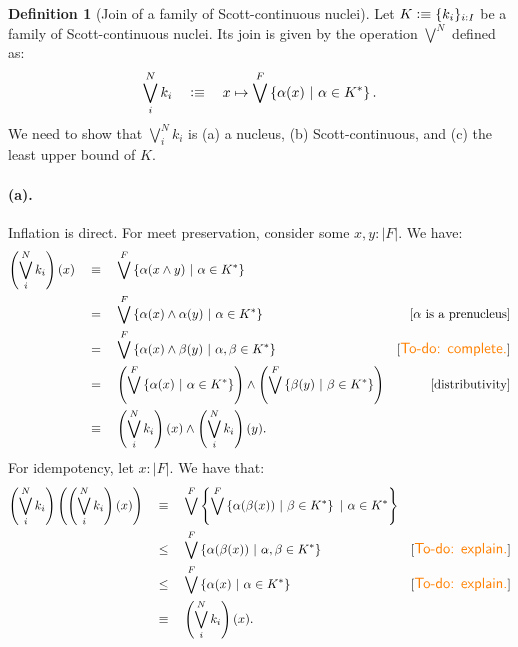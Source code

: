 \documentclass[a4paper, 11pt]{article}
\theoremstyle{definition}
\newtheorem{defn}{Definition}
\newcommand{\paren}[1]{\left( #1 \right)}
\newcommand{\setof}[1]{\left\{ #1 \right\}}
\newcommand{\is}{\vcentcolon\equiv}
\newcommand{\todo}[1]{{\large\color{orange}\textsf{To-do: #1.}}}
\begin{document}
\begin{defn}[Join of a family of Scott-continuous nuclei]
  Let $K \is \{ k_i \}_{i : I}$ be a family of Scott-continuous nuclei. Its join is given by
  the operation $\bigvee^N$ defined as:
  \begin{equation*}
    \bigvee^N_{i} k_i \quad\is\quad x \mapsto \bigvee^F \left\{ \alpha(x) ~|~ \alpha \in K^* \right\}.
  \end{equation*}
  We need to show that $\bigvee^N_{i} k_i$ is
    (a) a nucleus,
    (b) Scott-continuous, and
    (c) the least upper bound of $K$.

  \paragraph{(a).} Inflation is direct. For meet preservation, consider some $x, y : | F |$. We have:
  \begin{align*}
    \left(\bigvee^N_{i} k_i\right)(x)
    &\quad\equiv\quad \bigvee^F \left\{ \alpha(x \wedge y) ~|~ \alpha \in K^* \right\} \\
    &\quad=\quad \bigvee^F \left\{ \alpha(x) \wedge \alpha(y) ~|~ \alpha \in K^* \right\}
          & [\text{$\alpha$ is a prenucleus}] \\
    &\quad=\quad \bigvee^F \left\{ \alpha(x) \wedge \beta(y) ~|~ \alpha, \beta \in K^* \right\}
          & [\text{\todo{complete}}] \\
    &\quad=\quad \paren{\bigvee^F \setof{ \alpha(x) ~|~ \alpha \in K^* }} \wedge \paren{\bigvee^F \setof{ \beta(y) ~|~ \beta \in K^* }}
          & [\text{distributivity}] \\
    &\quad\equiv\quad \paren{\bigvee^N_i k_i}(x) \wedge \paren{\bigvee^N_i k_i}(y).
  \end{align*}
  For idempotency, let $x : | F |$. We have that:
  \begin{align*}
    \left(\bigvee^N_{i} k_i\right)\left(\left(\bigvee^N_{i} k_i\right)(x)\right)
    &\quad\equiv\quad \bigvee^F \setof{ \bigvee^F \setof{ \alpha(\beta(x)) ~|~ \beta \in K^* } ~|~ \alpha \in K^* } \\
    &\quad\le\quad \bigvee^F \setof{ \alpha(\beta(x)) ~|~ \alpha, \beta \in K^* } & [\text{\todo{explain}}]\\
    &\quad\le\quad \bigvee^F \setof{ \alpha(x) ~|~ \alpha \in K^* } & [\text{\todo{explain}}]\\
    &\quad\equiv\quad \paren{\bigvee^N_i k_i}(x).
  \end{align*}


\end{defn}
\end{document}
